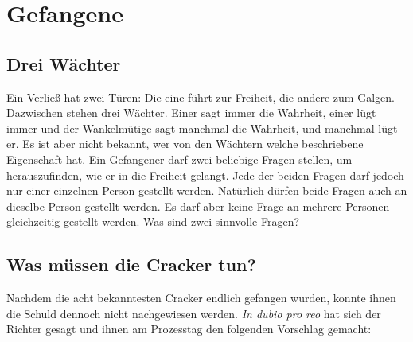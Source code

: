

\renewcommand{\author}{Philipp G. Freimann}
\renewcommand{\grafikautor}{Ph. G. Freimann}
\renewcommand{\authoremail}{philipp.freimann@bms-w.ch}
\renewcommand{\erstellungsdatum}{10. Nov. 2021}
\renewcommand{\docversion}{2.36 \TeX}
\renewcommand{\doctitel}{Denksportaufgaben}

\renewcommand{\fachthema}{Mathematischer Denkanstoß---}
\renewcommand{\ausrichtungAufTitelseite}{}



\ptitlepage
\newpage

\section{Gefangene}
\subsection{Drei Wächter}
Ein Verließ hat zwei Türen: Die eine führt zur
Freiheit, die andere zum Galgen. Dazwischen stehen drei Wächter. Einer sagt immer die Wahrheit, einer
lügt immer und der Wankelmütige sagt manchmal die Wahrheit, und manchmal
lügt er. Es ist aber nicht bekannt, wer von den Wächtern welche beschriebene
Eigenschaft hat.
Ein Gefangener darf zwei beliebige Fragen stellen, um herauszufinden, wie er in
die Freiheit gelangt. Jede der beiden Fragen darf jedoch nur einer
einzelnen Person
gestellt werden. Natürlich dürfen beide Fragen auch an dieselbe Person gestellt
werden. Es darf aber keine Frage an mehrere Personen gleichzeitig gestellt
werden. Was sind zwei sinnvolle Fragen?
\TNTeop{}


\subsection{Was müssen die Cracker tun?}

Nachdem die acht bekanntesten Cracker endlich gefangen
wurden, konnte ihnen die Schuld dennoch nicht nachgewiesen werden. \textit{In dubio pro reo} hat
sich der Richter gesagt und ihnen am Prozesstag den
folgenden Vorschlag gemacht:

